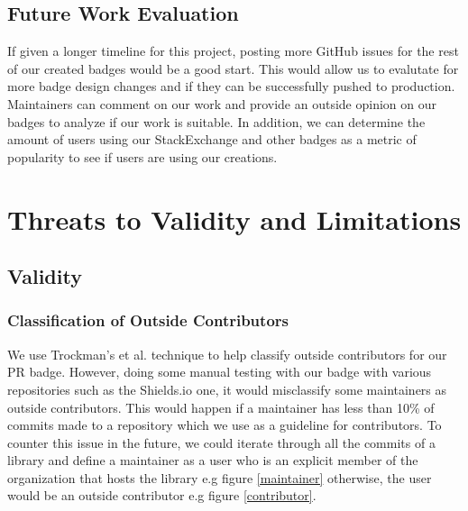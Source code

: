 \documentclass[12pt, letterpaper]{article}
\begin{document}
\subsection{Future Work Evaluation}
If given a longer timeline for this project, posting more GitHub issues for the rest of
our created badges would be a good start. This would allow us to evalutate for more badge design changes
and if they can be successfully pushed to production. Maintainers can comment on our work
and provide an outside opinion on our badges to analyze if our work is suitable. 
In addition, we can determine the amount of users using our StackExchange and other badges as
a metric of popularity to see if users are using our creations. 

\section{Threats to Validity and Limitations}

\subsection{Validity}
\subsubsection{Classification of Outside Contributors}
We use Trockman's et al. \cite{githubbadges} technique to help classify outside contributors for our PR badge.
However, doing some manual testing with our badge with various repositories such
as the Shields.io \cite{shieldsrepo} one, it would misclassify some maintainers as outside contributors.
This would happen if a maintainer has less than 10\% of commits made to a repository which we use as a guideline
for contributors.
To counter this issue in the future, we could iterate through all the commits of a library and define a maintainer as a user who is an explicit 
member of the organization that hosts
the library e.g figure \ref{maintainer} otherwise, the user would be an outside contributor e.g figure \ref{contributor}. 
\end{document}
